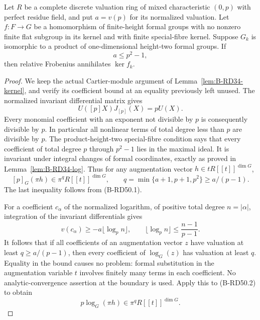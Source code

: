 \begin{lemma}
\label{lem:B-RD50-boundary}
Let $R$ be a complete discrete valuation ring of mixed characteristic
$(0,p)$ with perfect residue field, and put $a=v(p)$ for its normalized
valuation. Let $f:F\to G$ be a homomorphism of finite-height formal
groups with no nonzero finite flat subgroup in its kernel and with
finite special-fibre kernel. Suppose $G_k$ is isomorphic to a product
of one-dimensional height-two formal groups. If
\[
                              a\leq p^2-1,
                                                        \tag{B-RD50.1}
\]
then relative Frobenius annihilates $\ker f_k$.
\end{lemma}
\begin{proof}
We keep the actual Cartier-module argument of
Lemma~\ref{lem:B-RD34-kernel}, and verify its coefficient bound at
an equality previously left unused. The normalized invariant
differential matrix gives
\[
                  U([p]X)J_{[p]}(X)=pU(X).
\]
Every monomial coefficient with an exponent not divisible by $p$
is consequently divisible by $p$. In particular all nonlinear
terms of total degree less than $p$ are divisible by $p$.
The product-height-two special-fibre condition says that every
coefficient of total degree $p$ through $p^2-1$ lies in the
maximal ideal. It is invariant under integral changes of formal
coordinates, exactly as proved in Lemma~\ref{lem:B-RD34-log}.
Thus for any augmentation vector $h\in tR[[t]]^{\dim G}$,
\[
        [p]_G(\pi h)\in\pi^qR[[t]]^{\dim G},\qquad
        q=\min\{a+1,p+1,p^2\}\geq a/(p-1).
                                                        \tag{B-RD50.2}
\]
The last inequality follows from (B-RD50.1).

For a coefficient $c_\alpha$ of the normalized logarithm, of
positive total degree $n=|\alpha|$, integration of the invariant
differentials gives
\[
 v(c_\alpha)\geq-a\lfloor\log_p n\rfloor,
 \qquad \lfloor\log_p n\rfloor\leq\frac{n-1}{p-1}.
\]
It follows that if all coefficients of an augmentation vector
$z$ have valuation at least $q\geq a/(p-1)$, then every
coefficient of $\log_G(z)$ has valuation at least $q$.
Equality in the bound causes no problem: formal substitution
in the augmentation variable $t$ involves finitely many terms
in each coefficient. No analytic-convergence assertion at the
boundary is used. Apply this to (B-RD50.2) to obtain
\[
                      p\log_G(\pi h)\in\pi^qR[[t]]^{\dim G}.
                                                        \tag{B-RD50.3}
\]


\end{proof}
